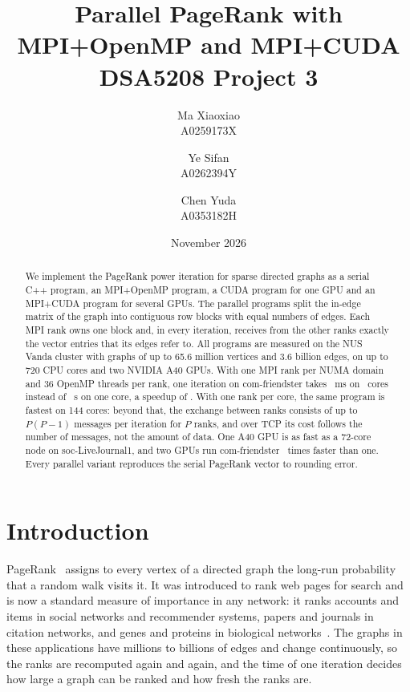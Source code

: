 \documentclass[11pt,a4paper]{article}
\title{\textbf{Parallel PageRank with MPI+OpenMP and MPI+CUDA}\\[4pt]\large DSA5208 Project 3}
\author{Ma Xiaoxiao\\\small A0259173X \and Ye Sifan\\\small A0262394Y \and Chen Yuda\\\small A0353182H}
\date{November 2026}
\begin{document}
\maketitle

\begin{abstract}
\noindent
We implement the PageRank power iteration for sparse directed graphs as a serial C++ program, an MPI+OpenMP program,
a CUDA program for one GPU and an MPI+CUDA program for several GPUs. The parallel programs split the in-edge matrix
of the graph into contiguous row blocks with equal numbers of edges. Each MPI rank owns one block and, in every
iteration, receives from the other ranks exactly the vector entries that its edges refer to. All programs are
measured on the NUS Vanda cluster with graphs of up to 65.6 million vertices and 3.6 billion edges, on up to 720 CPU
cores and two NVIDIA A40 GPUs. With one MPI rank per NUMA domain and 36 OpenMP threads per rank, one iteration on
com-friendster takes \stFRbest~ms on \stFRbestc\ cores instead of \stFRones~s on one core, a speedup of \stFRbestS.
With one rank per core, the same program is fastest on 144 cores: beyond that, the exchange between ranks consists
of up to $P(P-1)$ messages per iteration for $P$ ranks, and over TCP its cost follows the number of messages, not the
amount of data. One A40 GPU is as fast as a 72-core node on soc-LiveJournal1, and two GPUs run com-friendster
\mgFRS\ times faster than one. Every parallel variant reproduces the serial PageRank vector to rounding error.
\end{abstract}

\section{Introduction}

PageRank~\cite{pagerank} assigns to every vertex of a directed graph the long-run probability that a random walk
visits it. It was introduced to rank web pages for search and is now a standard measure of importance in any
network: it ranks accounts and items in social networks and recommender systems, papers and journals in citation
networks, and genes and proteins in biological networks~\cite{gleich}. The graphs in these applications have
millions to billions of edges and change continuously, so the ranks are recomputed again and again, and the time
of one iteration decides how large a graph can be ranked and how fresh the ranks are.
\end{document}
